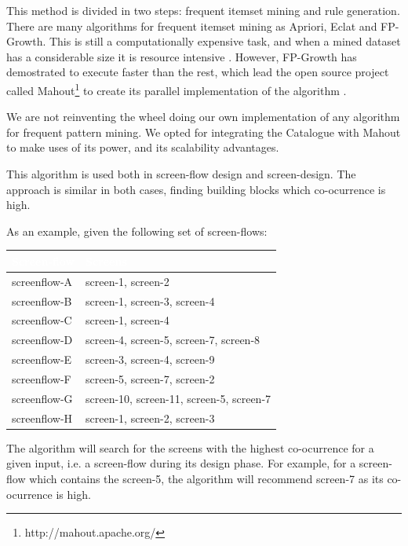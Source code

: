 \documentclass{fast_latex}
\begin{document}
This method is divided in two steps: frequent itemset mining and rule generation. There are many algorithms for frequent itemset mining as Apriori, Eclat and FP-Growth. This is still a computationally expensive task, and when a mined dataset has a considerable size it is resource intensive \cite{Han:2000:MFP:335191.335372}. However, FP-Growth has demostrated to execute faster than the rest, which lead the open source project called Mahout\footnote{http://mahout.apache.org/} to create its parallel implementation of the algorithm \cite{Li:2008:PPF:1454008.1454027}.

We are not reinventing the wheel doing our own implementation of any algorithm for frequent pattern mining. We opted for integrating the Catalogue with Mahout to make uses of its power, and its scalability advantages.

This algorithm is used both in screen-flow design and screen-design. The approach is similar in both cases, finding building blocks which co-ocurrence is high.

As an example, given the following set of screen-flows:

\begin{table}[h]
\begin{center}
\begin{tabular}{|p{3.5cm}|p{10cm}|}
\hline
\rowcolor{fast@lightgrey}\textcolor{white}{Screen-flow} &
                         \textcolor{white}{Screens} \\ \hline
screenflow-A & screen-1, screen-2 \\ \hline
screenflow-B & screen-1, screen-3, screen-4 \\ \hline
screenflow-C & screen-1, screen-4 \\ \hline
screenflow-D & screen-4, screen-5, screen-7, screen-8 \\ \hline
screenflow-E & screen-3, screen-4, screen-9 \\ \hline
screenflow-F & screen-5, screen-7, screen-2 \\ \hline
screenflow-G & screen-10, screen-11, screen-5, screen-7 \\ \hline
screenflow-H & screen-1, screen-2, screen-3 \\ \hline
\end{tabular}
\end{center}
\end{table}

The algorithm will search for the screens with the highest co-ocurrence for a given input, i.e. a screen-flow during its design phase. For example, for a screen-flow which contains the screen-5, the algorithm will recommend screen-7 as its co-ocurrence is high.
\end{document}
